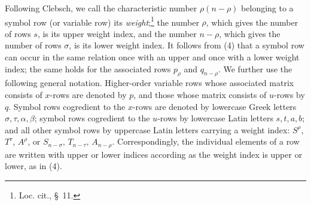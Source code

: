 \documentclass[11pt]{article}
\begin{document}
Following Clebsch, we call the characteristic number $\rho(n-\rho)$ belonging to a symbol row (or variable row) its \emph{weight};\footnote{Loc. cit., \S\ 11.} the number $\rho$, which gives the number of rows $s$, is its upper weight index, and the number $n-\rho$, which gives the number of rows $\sigma$, is its lower weight index. It follows from (4) that a symbol row can occur in the same relation once with an upper and once with a lower weight index; the same holds for the associated rows $p_\rho$ and $q_{n-\rho}$. We further use the following general notation. Higher-order variable rows whose associated matrix consists of $x$-rows are denoted by $p$, and those whose matrix consists of $u$-rows by $q$. Symbol rows cogredient to the $x$-rows are denoted by lowercase Greek letters $\sigma,\tau,\alpha,\beta$; symbol rows cogredient to the $u$-rows by lowercase Latin letters $s,t,a,b$; and all other symbol rows by uppercase Latin letters carrying a weight index: $S^\rho$, $T^\tau$, $A^\rho$, or $S_{n-\sigma}$, $T_{n-\tau}$, $A_{n-\rho}$. Correspondingly, the individual elements of a row are written with upper or lower indices according as the weight index is upper or lower, as in (4).
\end{document}
